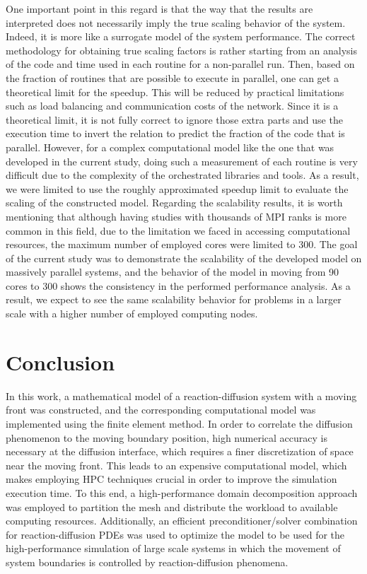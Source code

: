 One important point in this regard is that the way that the results are interpreted does not necessarily imply the true scaling behavior of the system. Indeed, it is more like a surrogate model of the system performance. The correct methodology for obtaining true scaling factors is rather starting from an analysis of the code and time used in each routine for a non-parallel run. Then, based on the fraction of routines that are possible to execute in parallel, one can get a theoretical limit for the speedup. This will be reduced by practical limitations such as load balancing and communication costs of the network. Since it is a theoretical limit, it is not fully correct to ignore those extra parts and use the execution time to invert the relation to predict the fraction of the code that is parallel. However, for a complex computational model like the one that was developed in the current study, doing such a measurement of each routine is very difficult due to the complexity of the orchestrated libraries and tools. As a result, we were limited to use the roughly approximated speedup limit to evaluate the scaling of the constructed model. Regarding the scalability results, it is worth mentioning that although having studies with thousands of \gls{MPI} ranks is more common in this field, due to the limitation we faced in accessing computational resources, the maximum number of employed cores were limited to 300. The goal of the current study was to demonstrate the scalability of the developed model on massively parallel systems, and the behavior of the model in moving from 90 cores to 300 shows the consistency in the performed performance analysis. As a result, we expect to see the same scalability behavior for problems in a larger scale with a higher number of employed computing nodes.



\section{Conclusion}

In this work, a mathematical model of a reaction-diffusion system with a moving front was constructed, and the corresponding computational model was implemented using the finite element method. In order to correlate the diffusion phenomenon to the moving boundary position, high numerical accuracy is necessary at the diffusion interface, which requires a finer discretization of space near the moving front. This leads to an expensive computational model, which makes employing \gls{HPC} techniques crucial in order to improve the simulation execution time. To this end, a high-performance domain decomposition approach was employed to partition the mesh and distribute the workload to available computing resources. Additionally, an efficient preconditioner/solver combination for reaction-diffusion \gls{PDE}s was used to optimize the model to be used for the high-performance simulation of large scale systems in which the movement of system boundaries is controlled by reaction-diffusion phenomena.


